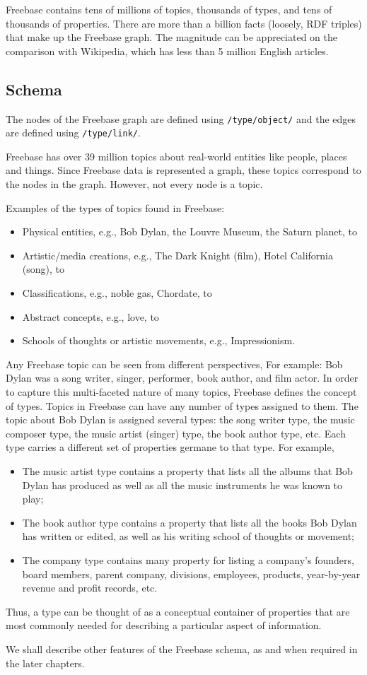 Freebase contains tens of millions of topics, thousands of types, and tens of thousands of properties. There are more than a billion facts (loosely, RDF triples) that make up the Freebase graph. The magnitude can be appreciated on the comparison with Wikipedia, which has less than 5 million English articles. 

\subsection{Schema}

The nodes of the Freebase graph are defined using \texttt{/type/object/} and the edges are defined using \texttt{/type/link/}.

Freebase has over 39 million topics about real-world entities like people, places and things. Since Freebase data is represented a graph, these topics correspond to the nodes in the graph. However, not every node is a topic.

Examples of the types of topics found in Freebase:
\begin{itemize}
  \item Physical entities, e.g., Bob Dylan, the Louvre Museum, the Saturn planet, to
  \item Artistic/media creations, e.g., The Dark Knight (film), Hotel California (song), to
  \item Classifications, e.g., noble gas, Chordate, to
  \item Abstract concepts, e.g., love, to
  \item Schools of thoughts or artistic movements, e.g., Impressionism.
\end{itemize}


Any Freebase topic can be seen from different perspectives, For example: Bob Dylan was a song writer, singer, performer, book author, and film actor. In order to capture this multi-faceted nature of many topics, Freebase defines the concept of types. Topics in Freebase can have any number of types assigned to them. The topic about Bob Dylan is assigned several types: the song writer type, the music composer type, the music artist (singer) type, the book author type, etc. Each type carries a different set of properties germane to that type. For example,
\begin{itemize}
\item The music artist type contains a property that lists all the albums that Bob Dylan has produced as well as all the music instruments he was known to play;
\item The book author type contains a property that lists all the books Bob Dylan has written or edited, as well as his writing school of thoughts or movement;
\item The company type contains many property for listing a company's founders, board members, parent company, divisions, employees, products, year-by-year revenue and profit records, etc.
\end{itemize}
Thus, a type can be thought of as a conceptual container of properties that are most commonly needed for describing a particular aspect of information.

We shall describe other features of the Freebase schema, as and when required in the later chapters.